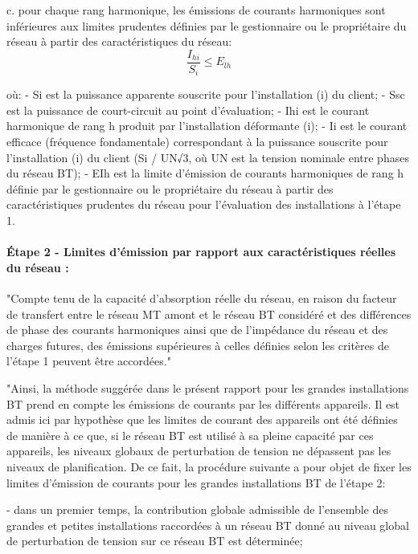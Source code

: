 c. pour chaque rang harmonique, les émissions de courants harmoniques sont inférieures aux limites prudentes définies par le gestionnaire ou le propriétaire du réseau à partir des caractéristiques du réseau:
\begin{equation}
    \frac{I_{hi}}{S_i} \leqslant E_{lh}
\end{equation}

où:
- Si est la puissance apparente souscrite pour l'installation (i) du client;
- Ssc est la puissance de court-circuit au point d'évaluation;
- Ihi est le courant harmonique de rang h produit par l'installation déformante (i);
- Ii est le courant efficace (fréquence fondamentale) correspondant à la puissance souscrite pour l'installation (i) du client (Si / UN√3, où UN est la tension nominale entre phases du réseau BT);
- EIh est la limite d'émission de courants harmoniques de rang h définie par le gestionnaire ou le propriétaire du réseau à partir des caractéristiques prudentes du réseau pour l'évaluation des installations à l'étape 1.



\paragraph{Étape 2 - Limites d'émission par rapport aux caractéristiques réelles du réseau :}

"Compte tenu de la capacité d'absorption réelle du réseau, en raison du facteur de transfert entre le réseau MT amont et le réseau BT considéré et des différences de phase des courants harmoniques ainsi que de l'impédance du réseau et des charges futures, des émissions supérieures à celles définies selon les critères de l'étape 1 peuvent être accordées."

"Ainsi, la méthode suggérée dans le présent rapport pour les grandes installations BT prend en compte les émissions de courants par les différents appareils. Il est admis ici par hypothèse que les limites de courant des appareils ont été définies de manière à ce que, si le réseau BT est utilisé à sa pleine capacité par ces appareils, les niveaux globaux de perturbation de tension ne dépassent pas les niveaux de planification. De ce fait, la procédure suivante a pour objet de fixer les limites d'émission de courants pour les grandes installations BT de l'étape 2:

- dans un premier temps, la contribution globale admissible de l'ensemble des grandes et petites installations raccordées à un réseau BT donné au niveau global de perturbation de tension sur ce réseau BT est déterminée;

